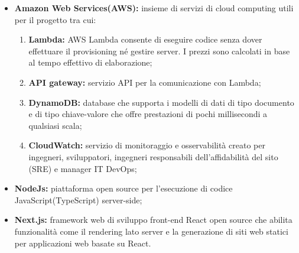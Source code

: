 \begin{itemize}
\item {\bf Amazon Web Services(AWS):} insieme di servizi di cloud computing utili per il progetto tra cui:
\begin{enumerate}
\item {\bf Lambda:} AWS Lambda consente di eseguire codice senza dover effettuare il provisioning né gestire server. I prezzi sono calcolati in base al tempo effettivo di elaborazione;
\item {\bf API gateway:} servizio API per la comunicazione con Lambda;
\item {\bf DynamoDB:} database che supporta i modelli di dati di tipo documento e di tipo chiave-valore che offre prestazioni di pochi millisecondi a qualsiasi scala;
\item {\bf CloudWatch:} servizio di monitoraggio e osservabilità creato per ingegneri, sviluppatori, ingegneri responsabili dell'affidabilità del sito (SRE) e manager IT DevOps;
\end{enumerate}
\item {\bf NodeJs:} piattaforma open source per l'esecuzione di codice JavaScript(TypeScript) server-side;
\item {\bf Next.js:} framework web di sviluppo front-end React open source che abilita funzionalità come il rendering lato server e la generazione di siti web statici per applicazioni web basate su React. 
\end{itemize}

